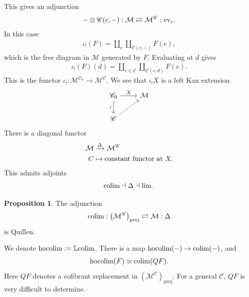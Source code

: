 \documentclass[12pt]{amsart}
\theoremstyle{definition}
\newtheorem{proposition}[theorem]{Proposition}
\begin{document}
This gives an adjunction
\begin{align*}
    - \otimes \mathscr{C}(c,-) : \mathcal{M} \rightleftarrows \mathcal{M}^{\mathscr{C}}: \text{ev}_c.
\end{align*}
In this case
\begin{align*}
    \iota_!(F) = \amalg_c \amalg_{\mathscr{C}(c,-)} F(c),
\end{align*}
which is the free diagram in $\mathcal{M}$ generated by $F$. Evaluating at $d$ gives
\begin{align*}
    \iota_!(F)(d) = \amalg_{c\in \mathscr{C}} \amalg_{\mathscr{C}(c,d)} F(c).
\end{align*}
This is the functor $\iota_! : \mathcal{M}^{\mathscr{C}_0} \to \mathcal{M}^{\mathscr{C}}$.
We see that $\iota_! X$ is a left Kan extension
\[ \begin{tikzcd}
    \mathscr{C}_0\dar[hook,"\iota" left]\rar["X"] & \mathcal{M}\\
    \mathscr{C}\ar[ur,dashed] & 
\end{tikzcd} \]
There is a diagonal functor
\begin{align*}
    \mathcal{M} &\xrightarrow{\Delta} \mathcal{M}^{\mathscr{C}} \\
    C &\mapsto \text{constant functor at }X.
\end{align*}
This admits adjoints
\begin{align*}
    \text{colim} \dashv \Delta \dashv \lim.
\end{align*}

\begin{proposition} The adjunction
\begin{align*}
    \text{colim}:\left( \mathcal{M}^{\mathscr{C}} \right)_\text{proj} \rightleftarrows \mathcal{M}: \Delta
\end{align*}
is Quillen.
\end{proposition}
We denote $\text{hocolim} := \mathbb{L} \text{colim}$. There is a map $\text{hocolim}(-) \to \text{colim}(-)$, and
\begin{align*}
    \text{hocolim}(F) \simeq \text{colim}(QF).
\end{align*}
Here $QF$ denotes a cofibrant replacement in $\left( \mathcal{M}^{\mathscr{C}} \right)_\text{proj}$. For a general $\mathscr{C}$, $QF$ is very difficult to determine.
\end{document}

